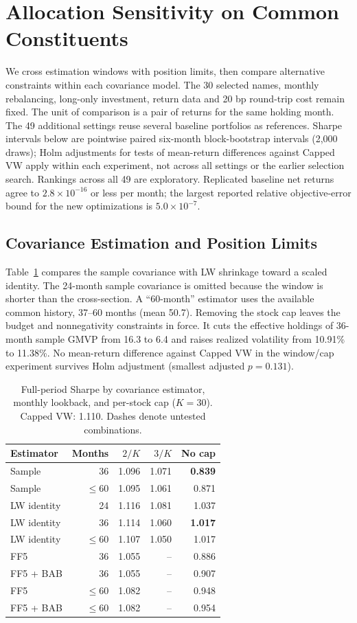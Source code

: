 \documentclass[letterpaper,journal]{IEEEtran}
\begin{document}
\section{Allocation Sensitivity on Common Constituents}\label{app:allocrobust}
We cross estimation windows with position limits, then compare alternative constraints within each covariance model. The 30 selected names, monthly rebalancing, long-only investment, return data and 20 bp round-trip cost remain fixed. The unit of comparison is a pair of returns for the same holding month. The 49 additional settings reuse several baseline portfolios as references. Sharpe intervals below are pointwise paired six-month block-bootstrap intervals (2,000 draws); Holm adjustments for tests of mean-return differences against Capped VW apply within each experiment, not across all settings or the earlier selection search. Rankings across all 49 are exploratory. Replicated baseline net returns agree to $2.8\times10^{-16}$ or less per month; the largest reported relative objective-error bound for the new optimizations is $5.0\times10^{-7}$.

\subsection{Covariance Estimation and Position Limits}
Table~\ref{tab:extwindows} compares the sample covariance with LW shrinkage toward a scaled identity. The 24-month sample covariance is omitted because the window is shorter than the cross-section. A ``60-month'' estimator uses the available common history, 37--60 months (mean 50.7). Removing the stock cap leaves the budget and nonnegativity constraints in force. It cuts the effective holdings of 36-month sample GMVP from 16.3 to 6.4 and raises realized volatility from 10.91\% to 11.38\%. No mean-return difference against Capped VW in the window/cap experiment survives Holm adjustment (smallest adjusted $p=0.131$).

\begin{table}[!t]\centering
\caption{Full-period Sharpe by covariance estimator, monthly lookback, and per-stock cap ($K=30$). Capped VW: 1.110. Dashes denote untested combinations.}\label{tab:extwindows}
\small\setlength{\tabcolsep}{4pt}\begin{tabular}{lrrrr}\toprule
Estimator & Months & $2/K$ & $3/K$ & No cap\\\midrule
Sample & 36 & 1.096 & 1.071 & \textbf{0.839}\\
Sample & $\leq60$ & 1.095 & 1.061 & 0.871\\
LW identity & 24 & 1.116 & 1.081 & 1.037\\
LW identity & 36 & 1.114 & 1.060 & \textbf{1.017}\\
LW identity & $\leq60$ & 1.107 & 1.050 & 1.017\\\midrule
FF5 & 36 & 1.055 & -- & 0.886\\
FF5 + BAB & 36 & 1.055 & -- & 0.907\\
FF5 & $\leq60$ & 1.082 & -- & 0.948\\
FF5 + BAB & $\leq60$ & 1.082 & -- & 0.954\\
\bottomrule\end{tabular}\end{table}
\end{document}
